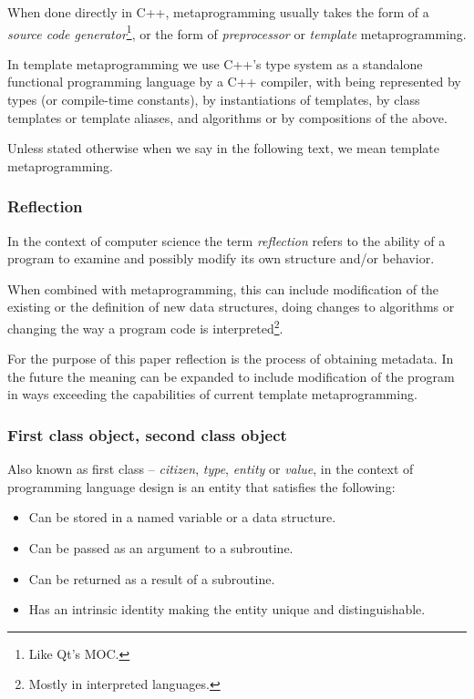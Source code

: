 When done directly in C++, metaprogramming usually takes the form of a
{\em source code generator}\footnote{Like Qt's MOC.}, or the form of {\em preprocessor}
or {\em template} metaprogramming.

In template metaprogramming we use C++'s type system
as a standalone functional programming language  by a C++
compiler, with  being
represented by types (or compile-time constants),
 by instantiations of templates,
 by class templates or template aliases, and
algorithms or  by compositions of the above.

Unless stated otherwise when we say  in the following text,
we mean template metaprogramming.

\subsubsection{Reflection}

In the context of computer science
the term {\em reflection} refers to the ability of a program to examine
and possibly modify its own structure and/or behavior.

When combined with metaprogramming, this can include modification of the existing
or the definition of new data structures, doing changes to algorithms or changing the way
a program code is interpreted\footnote{Mostly in interpreted languages.}.

For the purpose of this paper reflection is the process of obtaining metadata.
In the future the meaning can be expanded to include modification of the program
in ways exceeding the capabilities of current template metaprogramming.

\subsubsection{First class object, second class object}
\label{term-first-class}

Also known as first class -- {\em citizen}, {\em type}, {\em entity} or {\em value},
in the context of programming language design is an entity that satisfies
the following:

\begin{itemize}
	\item{Can be stored in a named variable or a data structure.}
	\item{Can be passed as an argument to a subroutine.}
	\item{Can be returned as a result of a subroutine.}
	\item{Has an intrinsic identity making the entity unique and distinguishable.}
\end{itemize}

